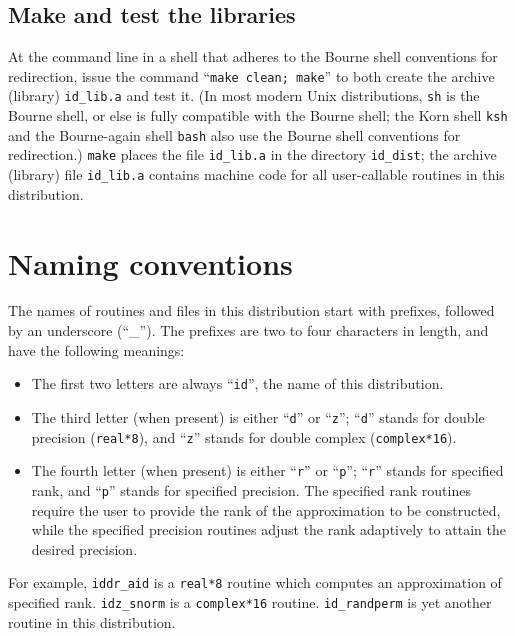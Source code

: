 \documentclass[letterpaper,12pt]{article}
\begin{document}
\subsection{Make and test the libraries}

At the command line in a shell that adheres
to the Bourne shell conventions for redirection, issue the command
``{\tt make clean; make}'' to both create the archive (library)
{\tt id\_lib.a} and test it.
(In most modern Unix distributions, {\tt sh} is the Bourne shell,
or else is fully compatible with the Bourne shell;
the Korn shell {\tt ksh} and the Bourne-again shell {\tt bash}
also use the Bourne shell conventions for redirection.)
{\tt make} places the file {\tt id\_lib.a}
in the directory {\tt id\_dist}; the archive (library) file
{\tt id\_lib.a} contains machine code for all user-callable routines
in this distribution.



\section{Naming conventions}
\label{naming}

The names of routines and files in this distribution
start with prefixes, followed by an underscore (``\_'').
The prefixes are two to four characters in length,
and have the following meanings:
%
\begin{itemize}
\item The first two letters are always ``{\tt id}'',
      the name of this distribution.
\item The third letter (when present) is either ``{\tt d}''
      or ``{\tt z}'';
      ``{\tt d}'' stands for double precision ({\tt real*8}),
      and ``{\tt z}'' stands for double complex ({\tt complex*16}).
\item The fourth letter (when present) is either ``{\tt r}''
      or ``{\tt p}'';
      ``{\tt r}'' stands for specified rank,
      and ``{\tt p}'' stands for specified precision.
      The specified rank routines require the user to provide
      the rank of the approximation to be constructed,
      while the specified precision routines adjust the rank adaptively
      to attain the desired precision.
\end{itemize}

For example, {\tt iddr\_aid} is a {\tt real*8} routine which computes
an approximation of specified rank.
{\tt idz\_snorm} is a {\tt complex*16} routine.
{\tt id\_randperm} is yet another routine in this distribution.
\end{document}
